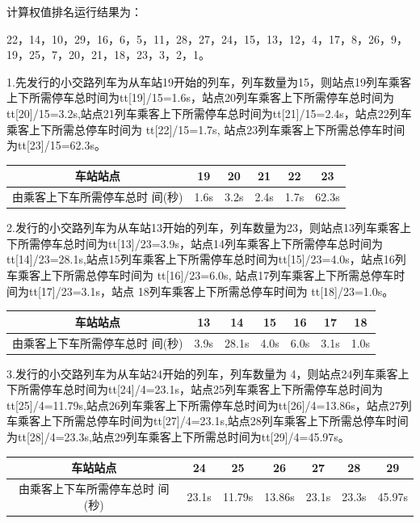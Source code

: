 \documentclass[UTF8]{ctexart}
\begin{document}
计算权值排名运行结果为：\par 22，14，10，29，16，6，5，11，28，27，24，15，13，12，4，17，8，26，9，19，25，7，20，21，18，23，3，2，1。\par
1.先发行的小交路列车为从车站19开始的列车，列车数量为15，则站点19列车乘客上下所需停车总时间为tt[19]/15=1.6s，站点20列车乘客上下所需停车总时间为tt[20]/15=3.2s,站点21列车乘客上下所需停车总时间为tt[21]/15=2.4s，站点22列车乘客上下所需总停车时间为 tt[22]/15=1.7s, 站点23列车乘客上下所需总停车时间为tt[23]/15=62.3s。\par
	\begin{center}
	\begin{tabular}{c|c|c|c|c|c} 
		车站站点 & 19 & 20 & 21 & 22 & 23 \\
		\hline
		由乘客上下车所需停车总时 间(秒) & 1.6s & 3.2s & 2.4s & 1.7s & 62.3s \\	
	\end{tabular}
\end{center}\par
2.发行的小交路列车为从车站13开始的列车，列车数量为23，则站点13列车乘客上下所需停车总时间为tt[13]/23=3.9s，站点14列车乘客上下所需停车总时间为 tt[14]/23=28.1s,站点15列车乘客上下所需停车总时间为tt[15]/23=4.0s，站点16列车乘客上下所需总停车时间为 tt[16]/23=6.0s, 站点17列车乘客上下所需总停车时间为tt[17]/23=3.1s，站点 18列车乘客上下所需总停车时间为 tt[18]/23=1.0s。\par
	\begin{center}
	\begin{tabular}{c|c|c|c|c|c|c} 
		车站站点 & 13 & 14 & 15 & 16 & 17 & 18 \\
		\hline
		由乘客上下车所需停车总时 间(秒) & 3.9s & 28.1s & 4.0s & 6.0s & 3.1s & 1.0s \\	
	\end{tabular}
\end{center}\par
3.发行的小交路列车为从车站24开始的列车，列车数量为 4，则站点24列车乘客上下所需停车总时间为tt[24]/4=23.1s，站点25列车乘客上下所需停车总时间为 tt[25]/4=11.79s,站点26列车乘客上下所需停车总时间为tt[26]/4=13.86s，站点27列车乘客上下所需总停车时间为tt[27]/4=23.1s,站点28列车乘客上下所需总停车时间为tt[28]/4=23.3s,站点29列车乘客上下所需总时间为tt[29]/4=45.97s。\par
	\begin{center}
	\begin{tabular}{c|c|c|c|c|c|c} 
		车站站点 & 24 & 25 & 26 & 27 & 28 & 29 \\
		\hline
		由乘客上下车所需停车总时 间(秒) & 23.1s & 11.79s & 13.86s & 23.1s & 23.3s & 45.97s \\	
	\end{tabular}
\end{center}\par
\end{document}
